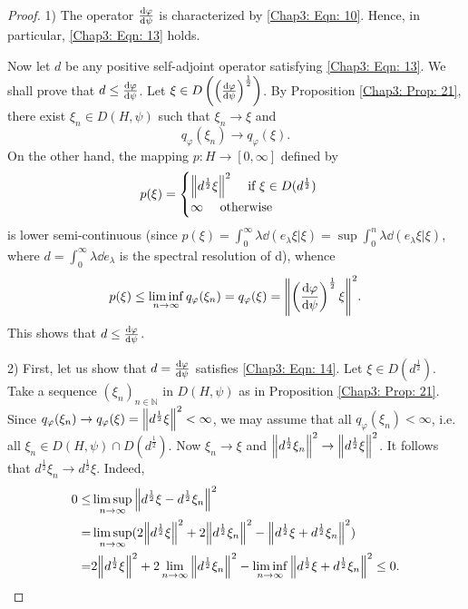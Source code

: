 \begin{proof}
    1) The operator $\dv{\varphi}{\psi}$ is characterized by \eqref{Chap3: Eqn: 10}. Hence, in particular, \eqref{Chap3: Eqn: 13} holds.\par
    Now let $d$ be any positive self-adjoint operator satisfying \eqref{Chap3: Eqn: 13}. We shall prove that $d\leq \dv{\varphi}{\psi}$. Let $\xi\in D\left( \left( \dv{\varphi}{\psi} \right)^\frac{1}{2} \right)$. By Proposition \ref{Chap3: Prop: 21}, there exist $\xi_n\in D(H,\psi)$ such that $\xi_n\to \xi$ and
    \[
        q_\varphi(\xi_n)\to q_\varphi(\xi).
    \]
    On the other hand, the mapping $p: H \to [0,\infty]$ defined by
    \begin{equation}\label{Chap3: Eqn: 15}
        p(\xi)=\begin{cases}
            \norm{d^\frac{1}{2}\xi}^2 \quad \text{ if } \xi\in D(d^\frac{1}{2}) \\
            \infty\quad \text{ otherwise }
        \end{cases}
    \end{equation}
    is lower semi-continuous (since $p(\xi)=\int_0^\infty \lambda\dd(e_\lambda \xi|\xi)=\sup\int_0^n \lambda\dd(e_\lambda \xi|\xi)$, where $d = \int_0^\infty\lambda\dd e_\lambda$ is the spectral resolution of d), whence
    \[
        p(\xi)\leq \liminf_{n\to \infty}q_\varphi(\xi_n)=q_\varphi(\xi)=\norm{\left( \dv{\varphi}{\psi} \right)^\frac{1}{2}\xi}^2.
    \]
    This shows that $d\leq\dv{\varphi}{\psi}$.\par
    2) First, let us show that $d = \dv{\varphi}{\psi}$ satisfies \eqref{Chap3: Eqn: 14}. Let $\xi\in D(d^\frac{1}{2})$. Take a sequence $(\xi_n)_{n\in \mathbb{N}}$ in $D(H,\psi)$ as in Proposition \ref{Chap3: Prop: 21}. Since $q_\varphi(\xi_n)\to q_\varphi(\xi)=\norm{d^\frac{1}{2}\xi}^2<\infty$, we may assume that all $q_\varphi(\xi_n)<\infty$, i.e. all $\xi_n\in D(H,\psi)\cap D(d^\frac{1}{2})$. Now $\xi_n\to \xi$ and $\norm{d^\frac{1}{2}\xi_n}^2\to \norm{d^\frac{1}{2}\xi}^2$. It follows that $d^\frac{1}{2}\xi_n\to d^\frac{1}{2}\xi$. Indeed,
    \[
        \begin{split}
            0\leq &\limsup_{n\to \infty}\norm{d^\frac{1}{2}\xi-d^\frac{1}{2}\xi_n}^2\\
            =&\limsup_{n\to \infty}(2\norm{d^\frac{1}{2}\xi}^2+2\norm{d^\frac{1}{2}\xi_n}^2-\norm{d^\frac{1}{2}\xi+d^\frac{1}{2}\xi_n}^2)\\
            =&2\norm{d^\frac{1}{2}\xi}^2+2\lim_{n\to \infty}\norm{d^\frac{1}{2}\xi_n}^2-\liminf_{n\to\infty}\norm{d^\frac{1}{2}\xi+d^\frac{1}{2}\xi_n}^2\leq 0.

\end{split}\]
\end{proof}
